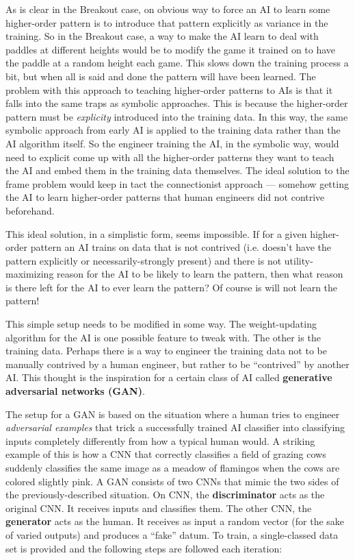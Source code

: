 \documentclass{article}
\renewcommand{\bf}{\textbf}
\renewcommand{\it}{\textit}
\begin{document}
As is clear in the Breakout case, on obvious way to force an AI to learn some higher-order pattern is to introduce that pattern explicitly as variance in the training.
So in the Breakout case, a way to make the AI learn to deal with paddles at different heights would be to modify the game it trained on to have the paddle at a random height each game. This slows down the training process a bit, but when all is said and done the pattern will have been learned.
The problem with this approach to teaching higher-order patterns to AIs is that it falls into the same traps as symbolic approaches.
This is because the higher-order pattern must be \it{explicity} introduced into the training data.
In this way, the same symbolic approach from early AI is applied to the training data rather than the AI algorithm itself.
So the engineer training the AI, in the symbolic way, would need to explicit come up with all the higher-order patterns they want to teach the AI and embed them in the training data themselves.
The ideal solution to the frame problem would keep in tact the connectionist approach --- somehow getting the AI to learn higher-order patterns that human engineers did not contrive beforehand.

This ideal solution, in a simplistic form, seems impossible.
If for a given higher-order pattern an AI trains on data that is not contrived (i.e. doesn't have the pattern explicitly or necessarily-strongly present) and there is not utility-maximizing reason for the AI to be likely to learn the pattern, then what reason is there left for the AI to ever learn the pattern? Of course is will not learn the pattern!

This simple setup needs to be modified in some way.
The weight-updating algorithm for the AI is one possible feature to tweak with.
The other is the training data.
Perhaps there is a way to engineer the training data not to be manually contrived by a human engineer, but rather to be ``contrived'' by another AI.
This thought is the inspiration for a certain class of AI called \textbf{generative adversarial networks (GAN)}.

The setup for a GAN is based on the situation where a human tries to engineer \it{adversarial examples} that trick a successfully trained AI classifier into classifying inputs completely differently from how a typical human would.
A striking example of this is how a CNN that correctly classifies a field of grazing cows suddenly classifies the same image as a meadow of flamingos when the cows are colored slightly pink.
A GAN consists of two CNNs that mimic the two sides of the previously-described situation.
On CNN, the \bf{discriminator} acts as the original CNN. It receives inputs and classifies them.
The other CNN, the \bf{generator} acts as the human. It receives as input a random vector (for the sake of varied outputs) and produces a ``fake'' datum.
To train, a single-classed data set is provided and the following steps are followed each iteration:
\end{document}
